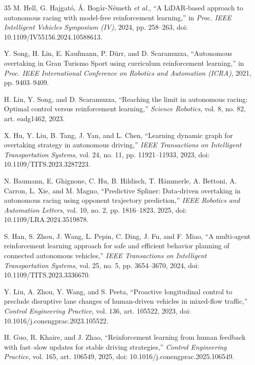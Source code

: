 \documentclass[final,5p,twocolumn]{elsarticle}
\begin{document}
\begin{thebibliography}{35}
M. Hell, G. Hajgat\'o, \'A. Bog\'ar-N\'emeth \emph{et al.},
``A LiDAR-based approach to autonomous racing with model-free reinforcement
learning,'' in \emph{Proc. IEEE Intelligent Vehicles Symposium (IV)}, 2024,
pp. 258--263, doi: 10.1109/IV55156.2024.10588613.

Y. Song, H. Lin, E. Kaufmann, P. D\"urr, and D. Scaramuzza,
``Autonomous overtaking in Gran Turismo Sport using curriculum reinforcement
learning,'' in \emph{Proc. IEEE International Conference on Robotics and
Automation (ICRA)}, 2021, pp. 9403--9409.

H. Lin, Y. Song, and D. Scaramuzza,
``Reaching the limit in autonomous racing: Optimal control versus
reinforcement learning,'' \emph{Science Robotics}, vol. 8, no. 82,
art. eadg1462, 2023.

X. Hu, Y. Liu, B. Tang, J. Yan, and L. Chen,
``Learning dynamic graph for overtaking strategy in autonomous driving,''
\emph{IEEE Transactions on Intelligent Transportation Systems}, vol. 24,
no. 11, pp. 11921--11933, 2023, doi: 10.1109/TITS.2023.3287223.

N. Baumann, E. Ghignone, C. Hu, B. Hildisch, T. H\"ammerle,
A. Bettoni, A. Carron, L. Xie, and M. Magno,
``Predictive Spliner: Data-driven overtaking in autonomous racing using
opponent trajectory prediction,'' \emph{IEEE Robotics and Automation
Letters}, vol. 10, no. 2, pp. 1816--1823, 2025,
doi: 10.1109/LRA.2024.3519878.

S. Han, S. Zhou, J. Wang, L. Pepin, C. Ding, J. Fu, and F. Miao,
``A multi-agent reinforcement learning approach for safe and efficient
behavior planning of connected autonomous vehicles,''
\emph{IEEE Transactions on Intelligent Transportation Systems}, vol. 25,
no. 5, pp. 3654--3670, 2024, doi: 10.1109/TITS.2023.3336670.

Y. Liu, A. Zhou, Y. Wang, and S. Peeta,
``Proactive longitudinal control to preclude disruptive lane changes of
human-driven vehicles in mixed-flow traffic,''
\emph{Control Engineering Practice}, vol. 136, art. 105522, 2023,
doi: 10.1016/j.conengprac.2023.105522.

H. Guo, R. Khaire, and J. Zhao,
``Reinforcement learning from human feedback with fast--slow updates for
stable driving strategies,'' \emph{Control Engineering Practice}, vol. 165,
art. 106549, 2025, doi: 10.1016/j.conengprac.2025.106549.


\end{thebibliography}
\end{document}
